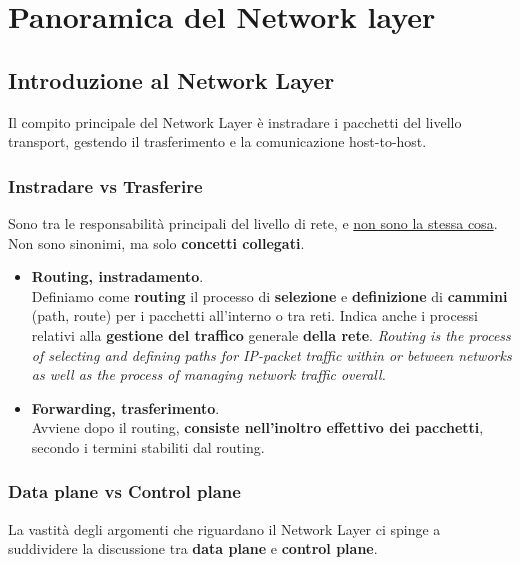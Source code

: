 \chapter{Panoramica del Network layer}

\section{Introduzione al Network Layer}
Il compito principale del Network Layer è instradare i pacchetti del livello transport, gestendo il trasferimento e la comunicazione host-to-host.



\subsection{Instradare vs Trasferire}
Sono tra le responsabilità principali del livello di rete, e \underline{non sono la stessa cosa}. Non sono sinonimi, ma solo \textbf{concetti collegati}.

\begin{itemize}
	\item \textbf{Routing, instradamento}.\\
	Definiamo come \textbf{routing} il processo di \textbf{selezione} e \textbf{definizione} di \textbf{cammini} (path, route) per i pacchetti all'interno o tra reti. Indica anche i processi relativi alla \textbf{gestione del traffico} generale \textbf{della rete}. \textit{Routing is the process of selecting and defining paths for IP-packet traffic within or between networks as well as the process of managing network traffic overall.}
	
	\item \textbf{Forwarding, trasferimento}.\\
	Avviene dopo il routing, \textbf{consiste nell'inoltro effettivo dei pacchetti}, secondo i termini stabiliti dal routing.
\end{itemize}

\subsection{Data plane vs Control plane}
La vastità degli argomenti che riguardano il Network Layer ci spinge a suddividere la discussione tra \textbf{data plane} e \textbf{control plane}.

